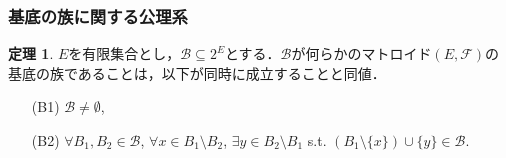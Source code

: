 \documentclass[xelatex,ja=standard,a4paper,14pt,everyparhook=compat]{bxjsarticle}
\theoremstyle{definition}
\newtheorem{theorem}{定理}[subsection]
\begin{document}
\newpage

\subsubsection*{基底の族に関する公理系}

\setcounter{theorem}{8}
\begin{theorem}
    $E$を有限集合とし，$\mathcal{B} \subseteq 2^E$とする．$\mathcal{B}$が何らかのマトロイド$(E, \mathcal{F})$の基底の族であることは，以下が同時に成立することと同値． \begin{enumerate}
        \item[(B1)] $\mathcal{B} \neq \emptyset$,
        \item[(B2)] $\forall B_1, B_2 \in \mathcal{B}$, $\forall x \in B_1 \setminus B_2$, $\exists y \in B_2 \setminus B_1$ s.t. $(B_1 \setminus \{x\}) \cup \{y\} \in \mathcal{B}$.
    \end{enumerate}
\end{theorem}
\end{document}
